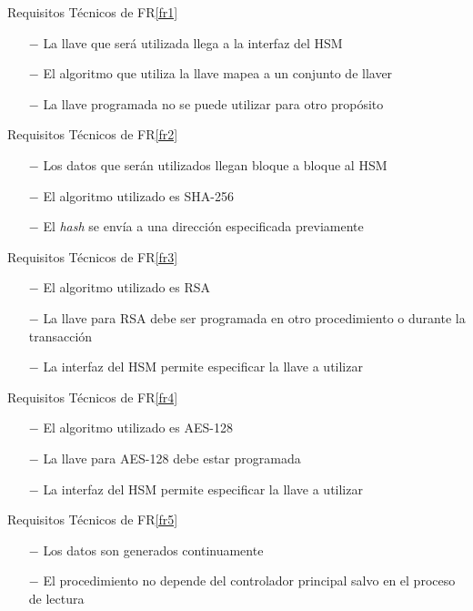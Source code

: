 \documentclass[a4paper]{article}
\begin{document}
    \begin{technical}
      \techrequirement
      {Requisitos Técnicos de FR\ref{fr1}}
      {
      \begin{itemize}
        \item[$-$]{La llave que será utilizada llega a la interfaz del HSM}
        \item[$-$]{El algoritmo que utiliza la llave mapea a un conjunto de llaver}
        \item[$-$]{La llave programada no se puede utilizar para otro propósito}
      \end{itemize}
      }
            
      \techrequirement
      {Requisitos Técnicos de FR\ref{fr2}}
      {
      \begin{itemize}
        \item[$-$]{Los datos que serán utilizados llegan bloque a bloque al HSM}
        \item[$-$]{El algoritmo utilizado es SHA-256}
        \item[$-$]{El \textit{hash} se envía a una dirección especificada previamente}
      \end{itemize}
      }
            
      \techrequirement
      {Requisitos Técnicos de FR\ref{fr3}}
      {
      \begin{itemize}
        \item[$-$]{El algoritmo utilizado es RSA}
        \item[$-$]{La llave para RSA debe ser programada en otro procedimiento o durante la transacción}
        \item[$-$]{La interfaz del HSM permite especificar la llave a utilizar}
      \end{itemize}
      }
            
      \techrequirement
      {Requisitos Técnicos de FR\ref{fr4}}
      {
      \begin{itemize}
        \item[$-$]{El algoritmo utilizado es AES-128}
        \item[$-$]{La llave para AES-128 debe estar programada}
        \item[$-$]{La interfaz del HSM permite especificar la llave a utilizar}
      \end{itemize}
      }
            
      \techrequirement
      {Requisitos Técnicos de FR\ref{fr5}}
      {
      \begin{itemize}
        \item[$-$]{Los datos son generados continuamente}
        \item[$-$]{El procedimiento no depende del controlador principal salvo en el proceso de lectura}
      \end{itemize}
      }
            

\end{technical}
\end{document}

